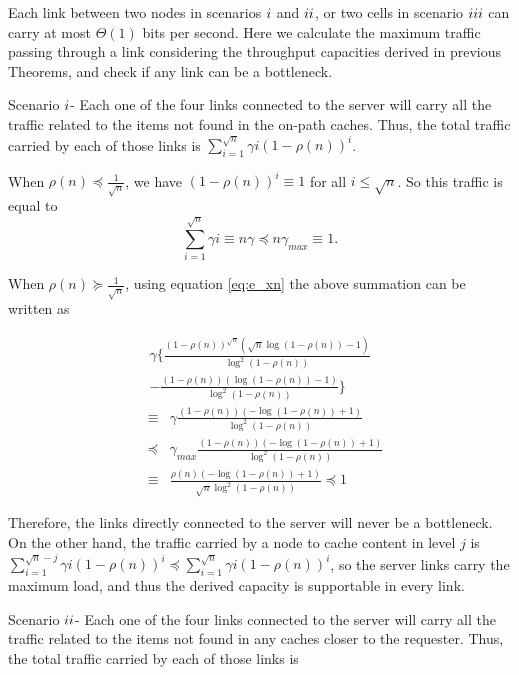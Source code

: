 \documentclass[journal]{IEEEtran}
\theoremstyle{plain}
\theoremstyle{remark}
\begin{document}
\begin{IEEEproof}
Each link between two nodes in scenarios $\romannumeral 1$ and $\romannumeral 2$, or two cells in scenario $\romannumeral 3$ can carry at most $\Theta(1)$ bits per second. Here we calculate the maximum traffic passing through a link considering the throughput capacities derived in previous Theorems, and check if any link can be a bottleneck.

Scenario $\romannumeral 1$-  Each one of the four links connected to the server will carry all the traffic related to the items not found in the on-path caches. Thus, the total traffic carried by each of those links is
$\sum_{i=1}^{\sqrt{n}}\gamma i (1-\rho(n))^i$.

When $\rho(n) \preceq \frac{1}{\sqrt{n}}$, we have $(1-\rho(n))^i \equiv 1$ for all $i\leq \sqrt{n}$. So this traffic is equal to
\begin{equation}
\sum_{i=1}^{\sqrt{n}}\gamma i \equiv n\gamma \preceq n\gamma_{max} \equiv 1.
\end{equation}

When $\rho(n) \succeq \frac{1}{\sqrt{n}}$, using equation \ref{eq:e_xn} the above summation can be written as

\begin{eqnarray}
\gamma \{\frac{(1-\rho(n))^{\sqrt{n}}(\sqrt{n}\log (1-\rho(n))-1)}{\log^2 (1-\rho(n))} \nonumber \\
- \frac{(1-\rho(n))(\log (1-\rho(n))-1)}{\log^2 (1-\rho(n))} \} \nonumber 
\end{eqnarray}
\begin{eqnarray}
&\equiv& \gamma \frac{(1-\rho(n))(-\log (1-\rho(n))+1)}{\log^2 (1-\rho(n))} \nonumber \\
&\preceq& \gamma_{max} \frac{(1-\rho(n))(-\log (1-\rho(n))+1)}{\log^2 (1-\rho(n))} \nonumber \\
&\equiv& \frac{\rho(n)(-\log (1-\rho(n))+1)}{\sqrt{n}\log^2 (1-\rho(n))} \preceq 1
\end{eqnarray}

Therefore, the links directly connected to the server will never be a bottleneck. On the other hand, the traffic carried by a node to cache content in level $j$ is $\sum_{i=1}^{\sqrt{n}-j}\gamma i(1-\rho(n))^i \preceq \sum_{i=1}^{\sqrt{n}}\gamma i(1-\rho(n))^i$, so the server links carry the maximum load, and thus the derived capacity is supportable in every link. 

Scenario $\romannumeral 2$- Each one of the four links connected to the server will carry all the traffic related to the items not found in any caches closer to the requester. Thus, the total traffic carried by each of those links is


\end{IEEEproof}
\end{document}
